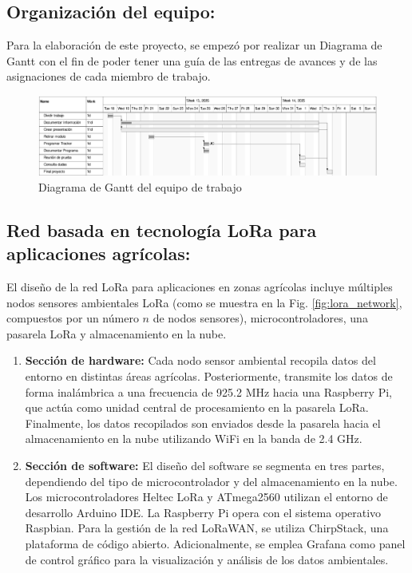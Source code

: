 \documentclass[conference]{IEEEtran}
\begin{document}
\newpage

\subsection*{Organización del equipo:}

Para la elaboración de este proyecto, se empezó por realizar un Diagrama de Gantt con el fin de poder tener una guía de las entregas de avances y de las asignaciones de cada miembro de trabajo.

\vspace{2mm}

\begin{figure}[H]
    \centering
    \includegraphics[width = 1\linewidth]{Imagenes/Diagrama de Gantt.jpg}
    \caption{Diagrama de Gantt del equipo de trabajo}
    \label{fig:Gantt}
\end{figure}


\subsection*{Red basada en tecnología LoRa para aplicaciones agrícolas:}

\vspace{2mm}

El diseño de la red LoRa para aplicaciones en zonas agrícolas incluye múltiples nodos sensores ambientales LoRa (como se muestra en la Fig. \ref{fig:lora_network}, compuestos por un número $n$ de nodos sensores), microcontroladores, una pasarela LoRa y almacenamiento en la nube.

\vspace{2mm}

\begin{enumerate}
    \item \textbf{Sección de hardware:} Cada nodo sensor ambiental recopila datos del entorno en distintas áreas agrícolas. Posteriormente, transmite los datos de forma inalámbrica a una frecuencia de 925.2 MHz hacia una Raspberry Pi, que actúa como unidad central de procesamiento en la pasarela LoRa. Finalmente, los datos recopilados son enviados desde la pasarela hacia el almacenamiento en la nube utilizando WiFi en la banda de 2.4 GHz.
    
    \item \textbf{Sección de software:} El diseño del software se segmenta en tres partes, dependiendo del tipo de microcontrolador y del almacenamiento en la nube. Los microcontroladores Heltec LoRa y ATmega2560 utilizan el entorno de desarrollo Arduino IDE. La Raspberry Pi opera con el sistema operativo Raspbian. Para la gestión de la red LoRaWAN, se utiliza ChirpStack, una plataforma de código abierto. Adicionalmente, se emplea Grafana como panel de control gráfico para la visualización y análisis de los datos ambientales.
\end{enumerate}
\end{document}
